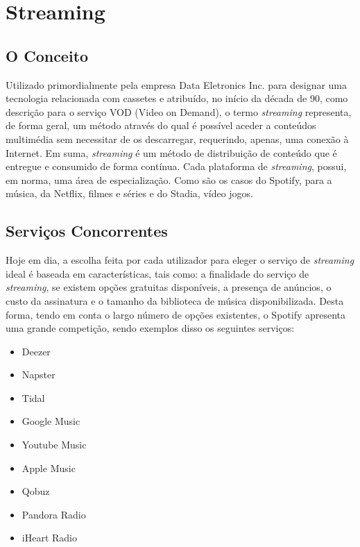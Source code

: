 \chapter{Streaming}
\label{streaming}
\section{O Conceito}
Utilizado primordialmente pela empresa Data Eletronics Inc. para designar uma tecnologia relacionada com cassetes e atribuído, no início da década de 90, como  descrição para o serviço VOD (Video on Demand), o termo \textit{streaming} representa, de forma geral, um método através do qual é possível aceder a conteúdos multimédia sem necessitar de os descarregar, requerindo, apenas, uma conexão à Internet. Em suma, \textit{streaming} é um método de distribuição de conteúdo que é entregue e consumido de forma contínua.
 Cada plataforma de \textit{streaming}, possui, em norma, uma área de especialização. Como são os casos do Spotify, para a música, da Netflix, filmes e séries e do Stadia, vídeo jogos. 

\section{Serviços Concorrentes}
Hoje em dia, a escolha feita por cada utilizador para eleger o serviço de \textit{streaming} ideal é baseada em características, tais como: a finalidade do serviço de \textit{streaming}, se existem opções gratuitas disponíveis, a presença de anúncios, o custo da assinatura e o tamanho da biblioteca de música disponibilizada. Desta forma, tendo em conta o largo número de opções existentes, o Spotify apresenta uma grande competição, sendo exemplos disso os seguintes serviços:

	\begin{itemize}
	\item Deezer
	\item Napster
	\item Tidal
	\item Google Music
 	\item Youtube Music
	\item Apple Music
	\item Qobuz	
	\item Pandora Radio
	\item iHeart Radio
	\end{itemize}

